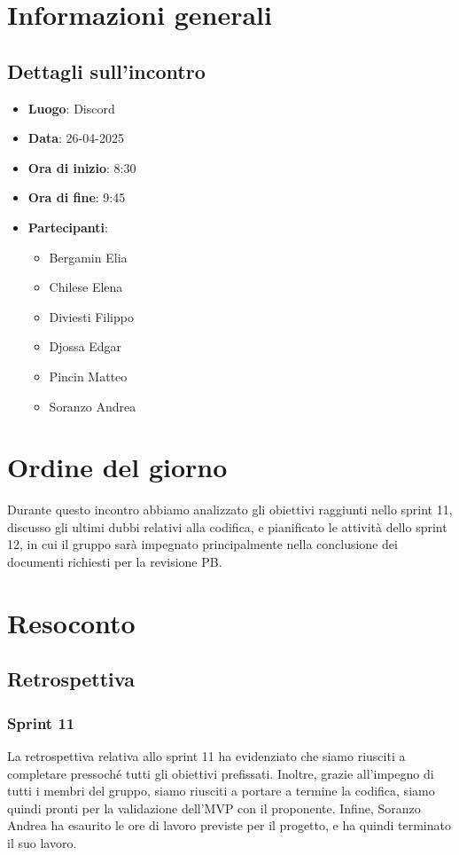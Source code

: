 \section{Informazioni generali}
\subsection{Dettagli sull'incontro}
\begin{itemize}
    \item \textbf{Luogo}: Discord
    \item \textbf{Data}: 26-04-2025
    \item \textbf{Ora di inizio}: 8:30
    \item \textbf{Ora di fine}: 9:45
    \item \textbf{Partecipanti}:
          \begin{itemize}
              \item Bergamin Elia
              \item Chilese Elena
              \item Diviesti Filippo
              \item Djossa Edgar
              \item Pincin Matteo
              \item Soranzo Andrea
          \end{itemize}
\end{itemize}

\section{Ordine del giorno}
Durante questo incontro abbiamo analizzato gli obiettivi raggiunti nello sprint
11, discusso gli ultimi dubbi relativi alla codifica, e pianificato le attività
dello sprint 12, in cui il gruppo sarà impegnato principalmente nella
conclusione dei documenti richiesti per la revisione PB.

\section{Resoconto}
\subsection{Retrospettiva}
\subsubsection{Sprint 11}
La retrospettiva relativa allo sprint 11 ha evidenziato che siamo riusciti a
completare pressoché tutti gli obiettivi prefissati. Inoltre, grazie
all'impegno di tutti i membri del gruppo, siamo riusciti a portare a termine la
codifica, siamo quindi pronti per la validazione dell'MVP con il proponente.
Infine, Soranzo Andrea ha esaurito le ore di lavoro previste per il progetto, e
ha quindi terminato il suo lavoro.

